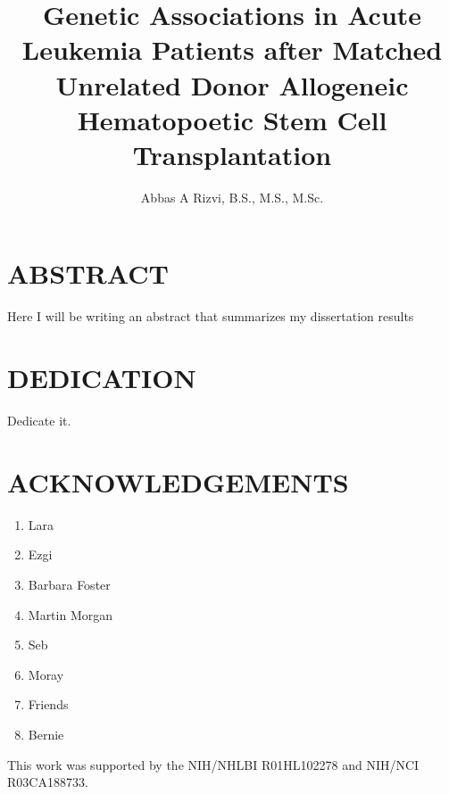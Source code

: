 \documentclass[]{DissertateUSU}
\title{Genetic Associations in Acute Leukemia Patients after Matched Unrelated
Donor Allogeneic Hematopoetic Stem Cell Transplantation}
\author{Abbas A Rizvi, B.S., M.S., M.Sc.}
\date{}
\providecommand{\tightlist}{%
  \setlength{\itemsep}{0pt}\setlength{\parskip}{0pt}}
\begin{document}
\maketitle

 \pagestyle{empty} \copyrightpage

\newpage

\pagestyle{fancy}  \fancyhead[R]{\thepage}
\fancyfoot[C]{} \chapter*{ABSTRACT}

Here I will be writing an abstract that summarizes my dissertation
results

\newpage

 \fancyhead[R]{\thepage} \fancyfoot[C]{}
\chapter*{DEDICATION} 

Dedicate it.

\newpage

 \fancyhead[R]{\thepage} \fancyfoot[C]{}
\chapter*{ACKNOWLEDGEMENTS}

\begin{enumerate}
\def\labelenumi{\arabic{enumi}.}
\setcounter{enumi}{-1}
\tightlist
\item
  Lara
\item
  Ezgi
\item
  Barbara Foster
\item
  Martin Morgan
\item
  Seb
\item
  Moray
\item
  Friends
\item
  Bernie
\end{enumerate}

This work was supported by the NIH/NHLBI R01HL102278 and NIH/NCI
R03CA188733.



\newpage

 \fancyhead[R]{\thepage} \fancyfoot[C]{}
\tableofcontents
\end{document}
